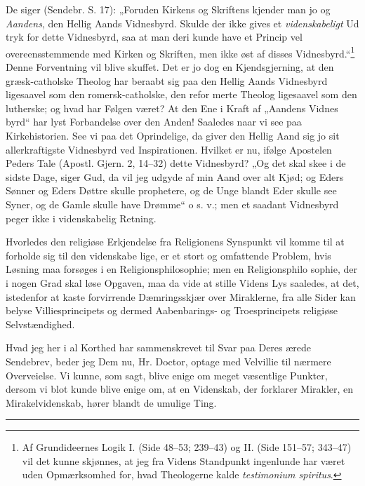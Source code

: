 \documentclass[12pt,a4paper]{article}
\newcommand{\opage}[1]{\marginnote{\footnotesize\textit{[#1]}}}
\begin{document}
De siger (Sendebr. S. 17): „Foruden Kirkens og%
Skriftens kjender man jo og \emph{Aandens}, den Hellig Aands
Vidnesbyrd. Skulde der ikke gives et \emph{videnskabeligt} Ud\-%
tryk for dette Vidnesbyrd, saa at man deri kunde have et
Princip vel overeensstemmende med Kirken og Skriften, men
ikke øst af disses Vidnesbyrd.“\footnote{Af Grundideernes Logik I. (Side 48--53; 239--43) og II. (Side
151--57; 343--47) vil det kunne skjønnes, at jeg fra Videns
Standpunkt ingenlunde har været uden Opmærksomhed for, hvad
Theologerne kalde \textit{testimonium spiritus}.} Denne Forventning vil%
blive skuffet. Det er jo dog en Kjendsgjerning, at den græsk-catholske%
Theolog har beraabt sig paa den Hellig Aands
Vidnesbyrd ligesaavel som den romersk-catholske, den refor\-%
merte Theolog ligesaavel som den lutherske; og hvad har
Følgen været? At den Ene i Kraft af „Aandens Vidnes\-%
byrd“ har lyst Forbandelse over den Anden! Saaledes naar
vi see paa Kirkehistorien. See vi paa det Oprindelige, da
giver den Hellig Aand sig jo sit allerkraftigste Vidnesbyrd
ved Inspirationen. Hvilket er nu, ifølge Apostelen Peders
Tale (Apostl. Gjern. 2, 14--32) dette Vidnesbyrd? „Og det
skal skee i de sidste Dage, siger Gud, da vil jeg udgyde af
min Aand over alt Kjød; og Eders Sønner og Eders
Døttre skulle prophetere, og de Unge blandt Eder skulle see
Syner, og de Gamle skulle have Drømme“ o s. v.; men%
et saadant Vidnesbyrd peger ikke i videnskabelig Retning.

Hvorledes den religiøse Erkjendelse fra Religionens
Synspunkt vil komme til at forholde sig til den videnskabe\-%
lige, er et stort og omfattende Problem, hvis Løsning maa
forsøges i en Religionsphilosophie; men en Religionsphilo\-%
sophie, der i nogen Grad skal løse Opgaven, maa da vide at
stille Videns Lys saaledes, at det, istedenfor at kaste forvirrende
Dæmringsskjær over Miraklerne, fra alle Sider kan belyse
\opage{16}\setcounter{footnote}{0}%
Villiesprincipets og dermed Aabenbarings- og Troesprincipets
religiøse Selvstændighed.

Hvad jeg her i al Korthed har sammenskrevet til Svar
paa Deres ærede Sendebrev, beder jeg Dem nu, Hr. Doctor,
optage med Velvillie til nærmere Overveielse. Vi kunne, som
sagt, blive enige om meget væsentlige Punkter, dersom vi
blot kunde blive enige om, at en Videnskab, der forklarer
Mirakler, en Mirakelvidenskab, hører blandt de umulige
Ting.
\begin{center}
\rule{0.25\textwidth}{0.4pt}
\end{center}
\end{document}
